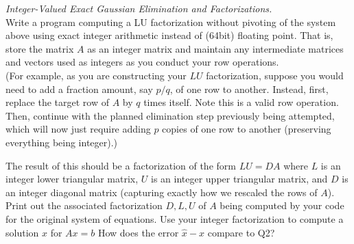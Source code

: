 \documentclass[11pt]{article}
\begin{document}
\vskip0.5cm

 {\it Integer-Valued Exact Gaussian Elimination and Factorizations.}\\
Write a program computing a LU factorization without pivoting of the system above using exact integer arithmetic instead of (64bit) floating point. That is, store the matrix $A$ as an integer matrix and maintain any intermediate matrices and vectors used as integers as you conduct your row operations.\\
(For example, as you are constructing your $LU$ factorization, suppose you would need to add a fraction amount, say $p/q$, of one row to another. Instead, first, replace the target row of $A$ by $q$ times itself. Note this is a valid row operation. Then, continue with the planned elimination step previously being attempted, which will now just require adding $p$ copies of one row to another (preserving everything being integer).)

The result of this should be a factorization of the form $LU=DA$ where $L$ is an integer lower triangular matrix, $U$ is an integer upper triangular matrix, and $D$ is an integer diagonal matrix (capturing exactly how we rescaled the rows of $A$).
Print out the associated factorization $D, L, U$ of $A$ being computed by your code for the original system of equations. Use your integer factorization to compute a solution $x$ for $Ax=b$ How does the error $\hat x - x$ compare to Q2?
\end{document}
